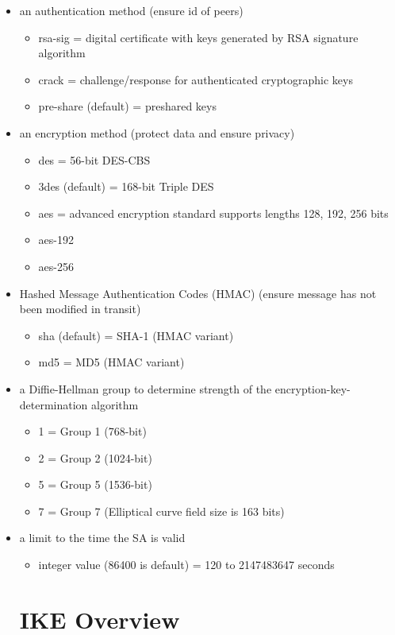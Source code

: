 \documentclass{report}
\newcommand{\squash}{\itemsep=0pt\parskip=0pt}
\begin{document}
\begin{itemize}
  \squash
\item an authentication method (ensure id of peers)
  \begin{itemize}
 \squash
  \item rsa-sig = digital certificate with keys generated by RSA signature algorithm
  \item crack = challenge/response for authenticated cryptographic keys
  \item pre-share (default) = preshared keys
  \end{itemize}
\item an encryption method (protect data and ensure privacy)
  \begin{itemize}
 \squash
  \item des = 56-bit DES-CBS
  \item 3des (default) = 168-bit Triple DES
  \item aes = advanced encryption standard supports lengths 128, 192, 256 bits
  \item aes-192
  \item aes-256  
  \end{itemize}
\item Hashed Message Authentication Codes (HMAC) (ensure message has not been modified in transit)
  \begin{itemize}
 \squash
  \item sha (default) = SHA-1 (HMAC variant)
  \item md5 = MD5 (HMAC variant)
  \end{itemize}
\item a Diffie-Hellman group to determine strength of the encryption-key-determination algorithm
  \begin{itemize}
 \squash
  \item 1 = Group 1 (768-bit)
  \item 2 = Group 2 (1024-bit)
  \item 5 = Group 5 (1536-bit)
  \item 7 = Group 7 (Elliptical curve field size is 163 bits)
  \end{itemize}
\item a limit to the time the SA is valid
  \begin{itemize}
 \squash
  \item integer value (86400 is default) = 120 to 2147483647 seconds
  \end{itemize}

\section{IKE Overview}


\end{itemize}
\end{document}
